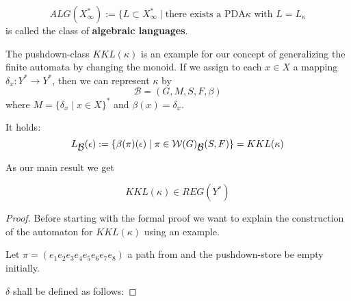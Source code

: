 \begin{definition}
\[ ALG(X_\infty^*) := \{ L \subset X_\infty^* \mid \text{there exists a PDA
$\kappa$ with $L = L_\kappa$} \]
is called the class of {\bf algebraic languages}.
\end{definition}

The pushdown-class $KKL(\kappa)$ is an example for our concept of generalizing
the finite automata by changing the monoid. If we assign to each $x\in X$ a
mapping $\delta_x: Y^* \to Y^*$, then we can represent $\kappa$ by
\[ \mathcal{B} = (G, M, S, F, \beta) \]
where $M = \{ \delta_x \mid x\in X \}^*$ and $\beta(x) = \delta_x$.

It holds:
\[ L_{\mbox{$\mathcal{B}$}}(\epsilon) := \{ \beta(\pi)(\epsilon) \mid \pi \in
\mbox{$\mathcal{W}(G)$}_{\mbox{$\mathcal{B}$}}(S, F) \} = KKL(\kappa) \]

As our main result we get
\begin{theorem}
\[ KKL(\kappa) \in REG(Y^*) \]
\end{theorem}

\begin{proof}
Before starting with the formal proof we want to explain the construction of the
automaton for $KKL(\kappa)$ using an example.

Let $\pi = (e_1 e_2 e_3 e_4 e_5 e_6 e_7 e_8)$ a path from  and the
pushdown-store be empty initially.

$\delta$ shall be defined as follows:


\end{proof}




























